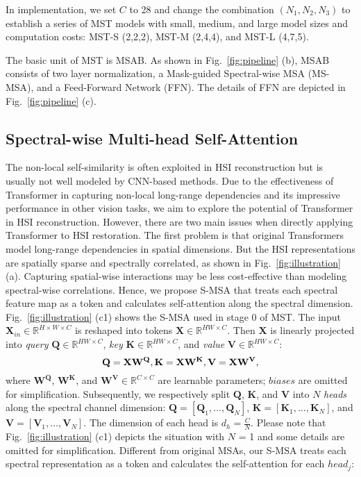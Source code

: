 \documentclass[10pt,twocolumn,letterpaper]{article}
\begin{document}
In implementation, we set $C$ to 28 and change the combination $(N_1,N_2,N_3)$ to establish a series of MST models with small, medium, and large model sizes and computation costs: MST-S (2,2,2), MST-M (2,4,4), and MST-L (4,7,5).

The basic unit of MST is MSAB. As shown in Fig.~\ref{fig:pipeline} (b), MSAB consists of two layer normalization, a Mask-guided Spectral-wise MSA (MS-MSA), and a Feed-Forward Network (FFN). The details of FFN are depicted in Fig.~\ref{fig:pipeline} (c). 


\subsection{Spectral-wise Multi-head Self-Attention}
The non-local self-similarity is often exploited in HSI reconstruction but is usually not well modeled by CNN-based methods. Due to the effectiveness of Transformer in capturing non-local long-range dependencies and its impressive performance in other vision tasks, we aim to explore the potential of Transformer in HSI reconstruction. However, there are two main issues when directly applying Transformer to HSI restoration. The first problem is that original Transformers model long-range dependencies in spatial dimensions. But the HSI representations are spatially sparse and spectrally  correlated, as shown in Fig.~\ref{fig:illustration} (a). Capturing spatial-wise interactions may be less cost-effective than modeling spectral-wise correlations.  Hence, we propose S-MSA that treats each spectral feature map as a token and calculates self-attention along the spectral dimension. Fig.~\ref{fig:illustration} (c1) shows the S-MSA used in stage 0 of MST. The input $\mathbf{X}_{in} \in \mathbb{R}^{H\times W \times C}$ is reshaped into tokens $\mathbf{X} \in \mathbb{R}^{HW \times C}$. Then $\mathbf{X}$ is linearly projected into \emph{query} $\mathbf{Q} \in \mathbb{R}^{HW \times C}$, \emph{key} $\mathbf{K} \in \mathbb{R}^{HW \times C}$, and \emph{value} $\mathbf{V} \in \mathbb{R}^{HW \times C}$: 
\vspace{0.2mm}
\begin{equation}
\mathbf{Q} = \mathbf{X}\mathbf{W}^\mathbf{Q}, \mathbf{K} = \mathbf{X}\mathbf{W}^\mathbf{K}, \mathbf{V} = \mathbf{X}\mathbf{W}^\mathbf{V},
\label{linear_proj}
\vspace{0.2mm}
\end{equation}
where $\mathbf{W}^\mathbf{Q}$, $\mathbf{W}^\mathbf{K}$, and $\mathbf{W}^\mathbf{V} \in \mathbb{R}^{C \times C}$ are learnable parameters; $biases$ are omitted for simplification. Subsequently, we respectively split $\mathbf{Q}$, $\mathbf{K}$, and $\mathbf{V}$ into $N$ \emph{heads} along the spectral channel dimension: $\mathbf{Q} = [\mathbf{Q}_1,\ldots,\mathbf{Q}_N]$, $\mathbf{K} = [\mathbf{K}_1,\ldots,\mathbf{K}_N]$, and $\mathbf{V} = [\mathbf{V}_1,\ldots,\mathbf{V}_N]$. The dimension of each head is $d_h = \frac{C}{N}$. Please note that Fig.~\ref{fig:illustration} (c1) depicts the situation with $N$ = 1 and some details are omitted for simplification. Different from original MSAs, our S-MSA treats each spectral representation as a token and calculates the self-attention for each $head_j$:
\end{document}
